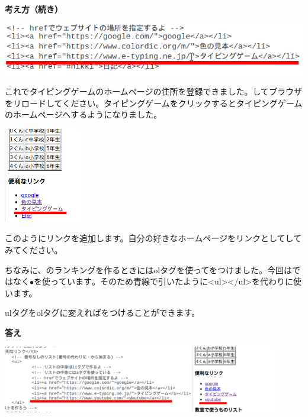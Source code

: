 \documentclass[a4paper,12pt]{jarticle}
\begin{document}
\clearpage
\flushleft
\textbf{考え方（続き）}


\bigskip

\centering
\includegraphics[width=\textwidth]{textbook-img200.png}

\bigskip
\flushleft

これでタイピングゲームのホームページの住所を登録できました。してブラウザをリロードしてください。タイピングゲームをクリックするとタイピングゲームのホームページへするようになりました。


\bigskip
\centering
\includegraphics[width=0.25\textwidth]{textbook-img201.png}


\flushleft
このようにリンクを追加します。自分の好きなホームページをリンクとしてしてみてください。

ちなみに、のランキングを作るときにはolタグを使ってをつけました。今回はではなく${\bullet}を使っています。そのため青線で引いたように${\textless}ul{\textgreater}{\textless}/ul{\textgreater}を代わりに使います。

ulタグをolタグに変えればをつけることができます。


\bigskip

\textbf{答え}

\centering
\includegraphics[width=0.9\textwidth]{textbook-img202.png}

\flushleft
{}\theQuestion\label{Q:hasAnswer04-10}
\end{document}
